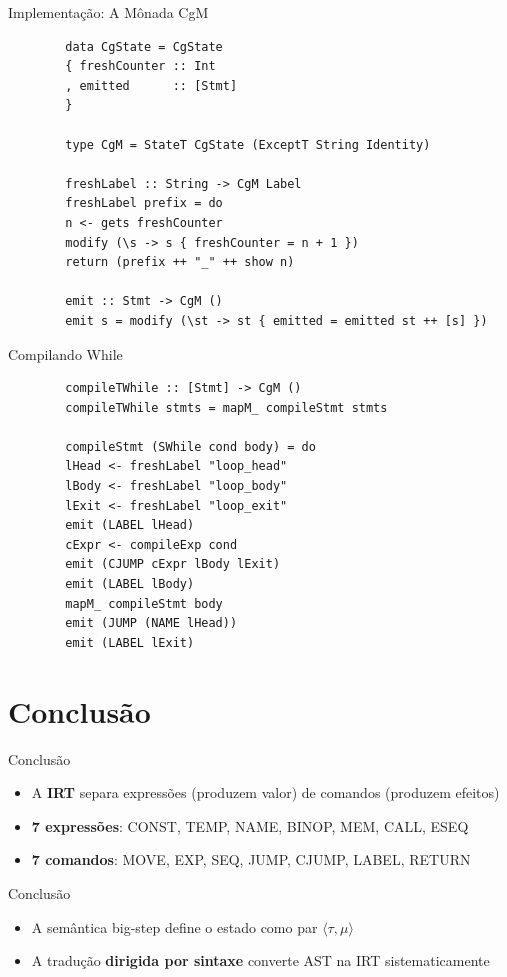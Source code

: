 \begin{frame}[fragile]{Implementação: A Mônada CgM}

    \begin{lstlisting}
        data CgState = CgState
        { freshCounter :: Int
        , emitted      :: [Stmt]
        }

        type CgM = StateT CgState (ExceptT String Identity)

        freshLabel :: String -> CgM Label
        freshLabel prefix = do
        n <- gets freshCounter
        modify (\s -> s { freshCounter = n + 1 })
        return (prefix ++ "_" ++ show n)

        emit :: Stmt -> CgM ()
        emit s = modify (\st -> st { emitted = emitted st ++ [s] })
    \end{lstlisting}
\end{frame}

\begin{frame}[fragile]{Compilando While}

    \begin{lstlisting}
        compileTWhile :: [Stmt] -> CgM ()
        compileTWhile stmts = mapM_ compileStmt stmts

        compileStmt (SWhile cond body) = do
        lHead <- freshLabel "loop_head"
        lBody <- freshLabel "loop_body"
        lExit <- freshLabel "loop_exit"
        emit (LABEL lHead)
        cExpr <- compileExp cond
        emit (CJUMP cExpr lBody lExit)
        emit (LABEL lBody)
        mapM_ compileStmt body
        emit (JUMP (NAME lHead))
        emit (LABEL lExit)
    \end{lstlisting}
\end{frame}


\section{Conclusão}\label{conclusuxe3o}

\begin{frame}{Conclusão}

    \begin{itemize}

        \item
        A \textbf{IRT} separa expressões (produzem valor) de comandos
        (produzem efeitos)
        \item
        \textbf{7 expressões}: CONST, TEMP, NAME, BINOP, MEM, CALL, ESEQ
        \item
        \textbf{7 comandos}: MOVE, EXP, SEQ, JUMP, CJUMP, LABEL, RETURN
    \end{itemize}
\end{frame}

\begin{frame}{Conclusão}

    \begin{itemize}

        \item
        A semântica big-step define o estado como par
        \(\langle \tau, \mu \rangle\)
        \item
        A tradução \textbf{dirigida por sintaxe} converte AST na IRT
        sistematicamente
    \end{itemize}
\end{frame}
